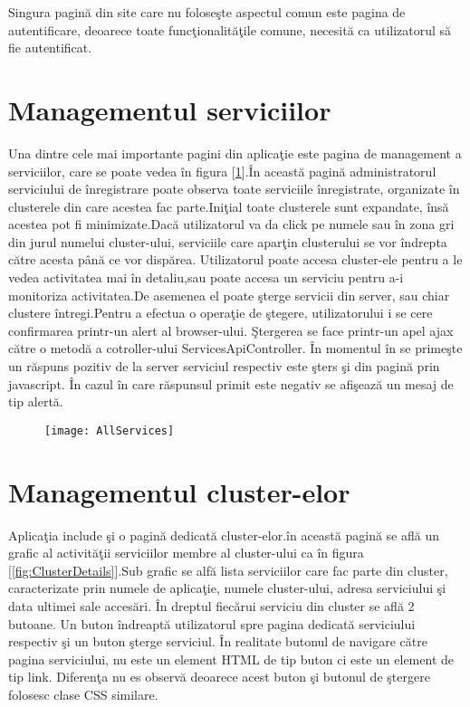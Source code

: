 \documentclass[a4paper,12pt]{report}
\let\oldref\ref
\renewcommand{\ref}[1]{[\oldref{#1}]}
\begin{document}
Singura pagin\u a din site care nu folose\c ste aspectul comun este pagina de autentificare, deoarece toate 
func\c tionalit\u a\c tile comune, necesit\u a ca utilizatorul s\u a fie autentificat.

\section{Managementul serviciilor}

Una dintre cele mai importante pagini din aplica\c tie este pagina de management a
serviciilor, care se poate vedea \^in figura \ref{fig:AllServices}.\^In aceast\u a pagin\u a
administratorul serviciului de \^inregistrare poate observa toate serviciile \^inregistrate,
organizate \^in clusterele din care acestea fac parte.Ini\c tial toate clusterele sunt expandate, \^ins\u a
acestea pot fi minimizate.Dac\u a utilizatorul va da click pe numele sau \^in zona gri din jurul numelui cluster-ului,
serviciile care apar\c tin clusterului se vor \^indrepta c\u atre acesta p\^an\u a ce vor disp\u area.
Utilizatorul poate accesa cluster-ele 
pentru a le vedea activitatea mai \^in detaliu,sau poate accesa un serviciu pentru 
a-i monitoriza activitatea.De asemenea el poate \c sterge servicii din server, sau chiar
clustere \^intregi.Pentru a efectua o opera\c tie de \c stegere, utilizatorului i se cere 
confirmarea printr-un alert al browser-ului. \c Stergerea se face printr-un apel ajax c\u atre o metod\u a 
a cotroller-ului ServicesApiController. 
\^In momentul \^in se prime\c ste un r\u aspuns pozitiv de la server serviciul respectiv este \c sters \c si din pagin\u a
prin javascript. \^In cazul \^in care r\u aspunsul primit este negativ se afi\c seaz\u a un mesaj de tip alert\u a.


\begin{figure}[!htb]
	\texttt{[image: AllServices]}
	\label{fig:AllServices}
\end{figure}

\section{Managementul cluster-elor}

Aplica\c tia include \c si o pagin\u a dedicat\u a cluster-elor.\^in aceast\u a pagin\u a se afl\u a 
un grafic al activit\u a\c tii serviciilor membre al cluster-ului ca \^in figura \ref{fig:ClusterDetails}.Sub grafic se  
alf\u a lista serviciilor care fac parte din cluster, caracterizate prin numele de aplica\c tie, 
numele cluster-ului, adresa serviciului \c si data ultimei sale acces\u ari.
\^In dreptul fiec\u arui serviciu din cluster se afl\u a 2 butoane. Un buton \^indreapt\u a utilizatorul spre pagina 
dedicat\u a serviciului respectiv \c si un buton \c sterge serviciul. \^In realitate butonul de navigare c\u atre pagina 
serviciului, nu este un element HTML de tip buton ci este un element de tip link. Diferen\c ta nu es observ\u a deoarece
acest buton \c si butonul de \c stergere folosesc clase CSS similare.
\end{document}
